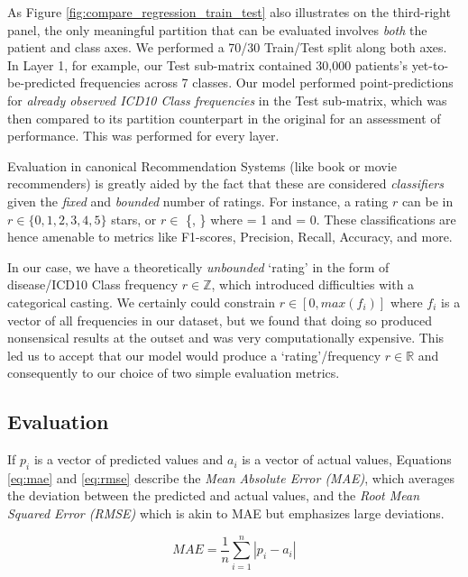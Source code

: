 \documentclass[twoside,11pt]{article}
\begin{document}
{As Figure \ref{fig:compare_regression_train_test} also illustrates on the third-right panel, the only meaningful partition that can be evaluated involves \textit{both} the patient and class axes. We performed a 70/30 Train/Test split along both axes. In Layer 1, for example, our Test sub-matrix contained 30,000 patients's yet-to-be-predicted frequencies across 7 classes. Our model performed point-predictions for \textit{already observed ICD10 Class frequencies} in the Test sub-matrix, which was then compared to its partition counterpart in the original for an assessment of performance. This was performed for every layer.



Evaluation in canonical Recommendation Systems (like book or movie recommenders) is greatly aided by the fact that these are considered \textit{classifiers} given the \textit{fixed} and \textit{bounded} number of ratings. For instance, a rating $r$ can be in $r\in\{0,1,2,3,4,5\}$ stars, or $r\in$ \{\faThumbsOUp, \faThumbsODown\} where \faThumbsOUp = 1 and \faThumbsODown = 0. These classifications are hence amenable to metrics like F1-scores, Precision, Recall, Accuracy, and more.

In our case, we have a theoretically \textit{unbounded} `rating' in the form of disease/ICD10 Class frequency $r\in\mathbb{Z}$, which introduced difficulties with a categorical casting. We certainly could constrain $r\in[0, max(f_i)]$ where $f_i$ is a vector of all frequencies in our dataset, but we found that doing so  produced nonsensical results at the outset and was very computationally expensive. This led us to accept that our model would produce a `rating'/frequency $r\in\mathbb{R}$ and consequently to our choice of two simple evaluation metrics.

\subsection{Evaluation}

If $p_i$ is a vector of predicted values and $a_i$ is a vector of actual values, Equations \ref{eq:mae} and \ref{eq:rmse} describe the \textit{Mean Absolute Error (MAE)}, which averages the deviation between the predicted and actual values, and the \textit{Root Mean Squared Error (RMSE)} which is akin to MAE but emphasizes large deviations.

\begin{equation}
  MAE = \frac{1}{n} \sum_{i = 1}^{n}|p_i - a_i|
  \label{eq:mae}
\end{equation}

}
\end{document}
